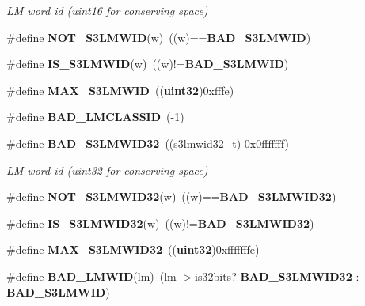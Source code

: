 \begin{DoxyCompactItemize}
\begin{DoxyCompactList}\small\item\em \-L\-M word id (uint16 for conserving space) \end{DoxyCompactList}\item 
\#define {\bfseries \-N\-O\-T\-\_\-\-S3\-L\-M\-W\-I\-D}(w)~((w)=={\bf \-B\-A\-D\-\_\-\-S3\-L\-M\-W\-I\-D})\label{s3types_8h_af536b75f1ecf7640b16c92d9a4903a66}

\item 
\#define {\bfseries \-I\-S\-\_\-\-S3\-L\-M\-W\-I\-D}(w)~((w)!={\bf \-B\-A\-D\-\_\-\-S3\-L\-M\-W\-I\-D})\label{s3types_8h_a53085819a64792f7442b64f4a85b458e}

\item 
\#define {\bfseries \-M\-A\-X\-\_\-\-S3\-L\-M\-W\-I\-D}~(({\bf uint32})0xfffe)\label{s3types_8h_a7cec519530089c34bae08704d2070b14}

\item 
\#define {\bfseries \-B\-A\-D\-\_\-\-L\-M\-C\-L\-A\-S\-S\-I\-D}~(-\/1)\label{s3types_8h_a0b572de40fa56a1aef9d435112659080}

\item 
\#define {\bf \-B\-A\-D\-\_\-\-S3\-L\-M\-W\-I\-D32}~((s3lmwid32\-\_\-t) 0x0fffffff)\label{s3types_8h_acdff89ca855bd57f8b8a07e18c8f9bb8}

\begin{DoxyCompactList}\small\item\em \-L\-M word id (uint32 for conserving space) \end{DoxyCompactList}\item 
\#define {\bfseries \-N\-O\-T\-\_\-\-S3\-L\-M\-W\-I\-D32}(w)~((w)=={\bf \-B\-A\-D\-\_\-\-S3\-L\-M\-W\-I\-D32})\label{s3types_8h_a4d01f032e1b34f0804987af14ea08fba}

\item 
\#define {\bfseries \-I\-S\-\_\-\-S3\-L\-M\-W\-I\-D32}(w)~((w)!={\bf \-B\-A\-D\-\_\-\-S3\-L\-M\-W\-I\-D32})\label{s3types_8h_acb7fd59ff9048383d349f7f95f636830}

\item 
\#define {\bfseries \-M\-A\-X\-\_\-\-S3\-L\-M\-W\-I\-D32}~(({\bf uint32})0xfffffffe)\label{s3types_8h_a163d1619c71a872c4ebfd839cf67c60e}

\item 
\#define {\bfseries \-B\-A\-D\-\_\-\-L\-M\-W\-I\-D}(lm)~(lm-\/$>$is32bits? {\bf \-B\-A\-D\-\_\-\-S3\-L\-M\-W\-I\-D32} \-: {\bf \-B\-A\-D\-\_\-\-S3\-L\-M\-W\-I\-D})\label{s3types_8h_ac84f2f2a422b294d90458b5330604ce3}


\end{DoxyCompactItemize}
